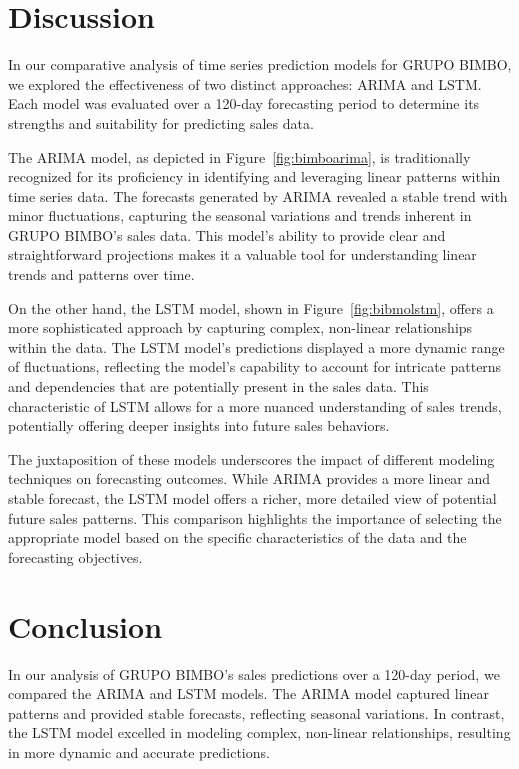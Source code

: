 \documentclass[conference]{IEEEtran}
\begin{document}
\section{Discussion}

In our comparative analysis of time series prediction models for GRUPO BIMBO, we explored the effectiveness of two distinct approaches: ARIMA and LSTM. Each model was evaluated over a 120-day forecasting period to determine its strengths and suitability for predicting sales data.

The ARIMA model, as depicted in Figure~\ref{fig:bimboarima}, is traditionally recognized for its proficiency in identifying and leveraging linear patterns within time series data. The forecasts generated by ARIMA revealed a stable trend with minor fluctuations, capturing the seasonal variations and trends inherent in GRUPO BIMBO's sales data. This model's ability to provide clear and straightforward projections makes it a valuable tool for understanding linear trends and patterns over time.

On the other hand, the LSTM model, shown in Figure~\ref{fig:bibmolstm}, offers a more sophisticated approach by capturing complex, non-linear relationships within the data. The LSTM model's predictions displayed a more dynamic range of fluctuations, reflecting the model's capability to account for intricate patterns and dependencies that are potentially present in the sales data. This characteristic of LSTM allows for a more nuanced understanding of sales trends, potentially offering deeper insights into future sales behaviors.

The juxtaposition of these models underscores the impact of different modeling techniques on forecasting outcomes. While ARIMA provides a more linear and stable forecast, the LSTM model offers a richer, more detailed view of potential future sales patterns. This comparison highlights the importance of selecting the appropriate model based on the specific characteristics of the data and the forecasting objectives.
\section{Conclusion}

In our analysis of GRUPO BIMBO's sales predictions over a 120-day period, we compared the ARIMA and LSTM models. The ARIMA model captured linear patterns and provided stable forecasts, reflecting seasonal variations. In contrast, the LSTM model excelled in modeling complex, non-linear relationships, resulting in more dynamic and accurate predictions.
\end{document}
